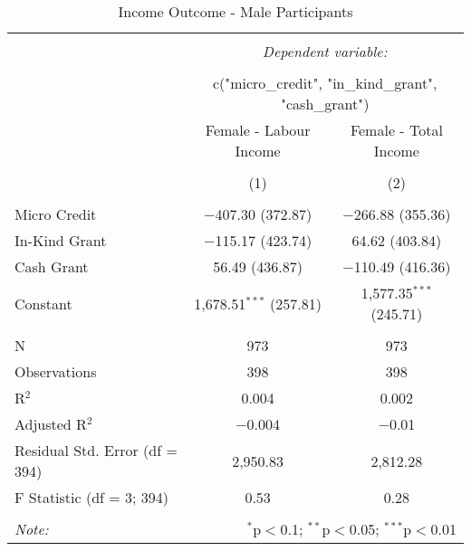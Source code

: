 
\begin{table}[!htbp] \centering 
  \caption{Income Outcome - Male Participants} 
  \label{} 
\small 
\begin{tabular}{@{\extracolsep{5pt}}lcc} 
\\[-1.8ex]\hline 
\hline \\[-1.8ex] 
 & \multicolumn{2}{c}{\textit{Dependent variable:}} \\ 
\cline{2-3} 
\\[-1.8ex] & \multicolumn{2}{c}{c("micro\_credit", "in\_kind\_grant", "cash\_grant")} \\ 
 & Female - Labour Income & Female - Total Income \\ 
\\[-1.8ex] & (1) & (2)\\ 
\hline \\[-1.8ex] 
 Micro Credit & $-$407.30 (372.87) & $-$266.88 (355.36) \\ 
  In-Kind Grant & $-$115.17 (423.74) & 64.62 (403.84) \\ 
  Cash Grant & 56.49 (436.87) & $-$110.49 (416.36) \\ 
  Constant & 1,678.51$^{***}$ (257.81) & 1,577.35$^{***}$ (245.71) \\ 
 \hline \\[-1.8ex] 
N & 973 & 973 \\ 
Observations & 398 & 398 \\ 
R$^{2}$ & 0.004 & 0.002 \\ 
Adjusted R$^{2}$ & $-$0.004 & $-$0.01 \\ 
Residual Std. Error (df = 394) & 2,950.83 & 2,812.28 \\ 
F Statistic (df = 3; 394) & 0.53 & 0.28 \\ 
\hline 
\hline \\[-1.8ex] 
\textit{Note:}  & \multicolumn{2}{r}{$^{*}$p$<$0.1; $^{**}$p$<$0.05; $^{***}$p$<$0.01} \\ 
\end{tabular} 
\end{table} 
